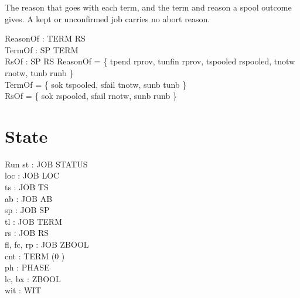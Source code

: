 \documentclass[a4paper,10pt,fleqn]{article}
\begin{document}
The reason that goes with each term, and the term and reason a spool outcome
gives. A kept or unconfirmed job carries no abort reason.

\begin{axdef}
ReasonOf : TERM \pfun RS \\
TermOf : SP \pfun TERM \\
RsOf : SP \pfun RS
\where
ReasonOf = \{ tpend \mapsto rprov, tunfin \mapsto rprov,
  tspooled \mapsto rspooled,
  tnotw \mapsto rnotw, tunb \mapsto runb \} \\
TermOf = \{ sok \mapsto tspooled, sfail \mapsto tnotw, sunb \mapsto tunb \} \\
RsOf = \{ sok \mapsto rspooled, sfail \mapsto rnotw, sunb \mapsto runb \}
\end{axdef}


\section{State}
\label{sec:state}

\begin{schema}{Run}
st : JOB \fun STATUS \\
loc : JOB \fun LOC \\
ts : JOB \fun TS \\
ab : JOB \fun AB \\
sp : JOB \fun SP \\
tl : JOB \fun TERM \\
rs : JOB \fun RS \\
fl, fc, rp : JOB \fun ZBOOL \\
cnt : TERM \fun (0 ) \\
ph : PHASE \\
lc, bx : ZBOOL \\
wit : \power WIT
\end{schema}
\end{document}

